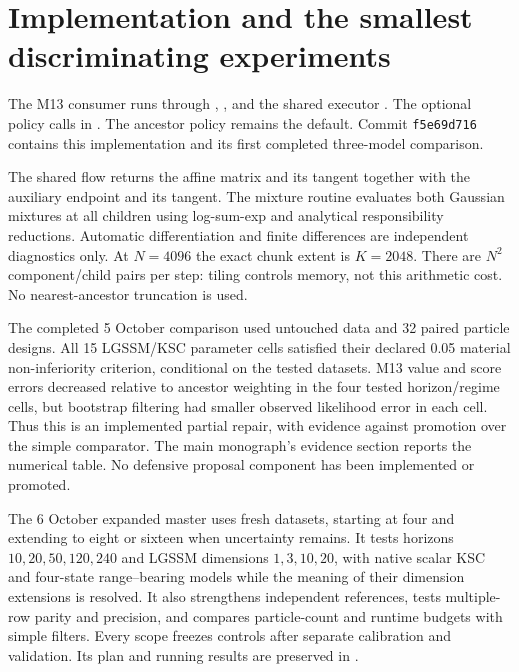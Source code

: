 \documentclass[11pt]{article}
\begin{document}
\section{Implementation and the smallest discriminating experiments}

The M13 consumer runs through
,
, and the shared executor
. The optional policy
 calls
 in
. The ancestor policy remains the default.
Commit \texttt{f5e69d716} contains this implementation and its first completed
three-model comparison.

The shared flow returns the affine matrix and its tangent together with the
auxiliary endpoint and its tangent. The mixture routine evaluates both
Gaussian mixtures at all children using log-sum-exp and analytical
responsibility reductions. Automatic differentiation and finite differences
are independent diagnostics only. At $N=4096$ the exact chunk extent is
$K=2048$. There are $N^2$ component/child pairs per step: tiling controls
memory, not this arithmetic cost. No nearest-ancestor truncation is used.

The completed 5 October comparison used untouched data and 32 paired
particle designs. All 15 LGSSM/KSC parameter cells satisfied their declared
0.05 material non-inferiority criterion, conditional on the tested datasets.
M13 value and score errors decreased relative to ancestor weighting in the
four tested horizon/regime cells, but bootstrap filtering had smaller
observed likelihood error in each cell. Thus this is an implemented partial
repair, with evidence against promotion over the simple comparator.
The main monograph's evidence section reports the numerical table.
No defensive proposal component has been implemented or promoted.

The 6 October expanded master uses fresh datasets, starting at four and
extending to eight or sixteen when uncertainty remains. It tests horizons
$10,20,50,120,240$ and LGSSM dimensions $1,3,10,20$, with native scalar KSC
and four-state range--bearing models while the meaning of their dimension
extensions is resolved. It also strengthens independent references, tests
multiple-row parity and precision, and compares particle-count and runtime
budgets with simple filters. Every scope freezes controls after separate
calibration and validation. Its plan and running results are preserved in
.
\end{document}
